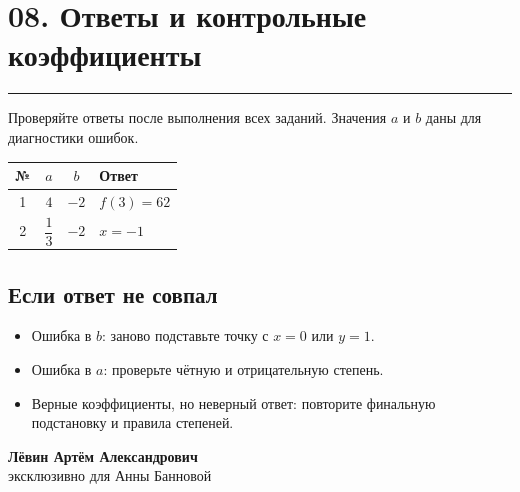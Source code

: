 \documentclass[a4paper,12pt]{article}
\newcommand{\sectionline}{\par\vspace{-3pt}\noindent\textcolor{accent}{\rule{\linewidth}{0.5pt}}\par\vspace{2pt}}
\begin{document}
\section*{08. Ответы и контрольные коэффициенты}
\sectionline
\textcolor{muted}{Проверяйте ответы после выполнения всех заданий. Значения $a$ и $b$ даны для диагностики ошибок.}
\begin{center}
\begin{tabularx}{\linewidth}{@{}c c c >{\raggedright\arraybackslash}X@{}}
\toprule
\textbf{№}&\textbf{$a$}&\textbf{$b$}&\textbf{Ответ}\\
\midrule
1&$4$&$-2$&$f(3)=62$\\
2&$\dfrac13$&$-2$&$x=-1$\\
\bottomrule
\end{tabularx}
\end{center}
\vspace{9mm}
\subsection*{Если ответ не совпал}
\begin{itemize}
\item Ошибка в $b$: заново подставьте точку с $x=0$ или $y=1$.
\item Ошибка в $a$: проверьте чётную и отрицательную степень.
\item Верные коэффициенты, но неверный ответ: повторите финальную подстановку и правила степеней.
\end{itemize}
\vfill
\begin{center}
\textcolor{darkaccent}{\textbf{Лёвин Артём Александрович}}\\[1mm]
\textcolor{muted}{эксклюзивно для Анны Банновой}
\end{center}
\end{document}

